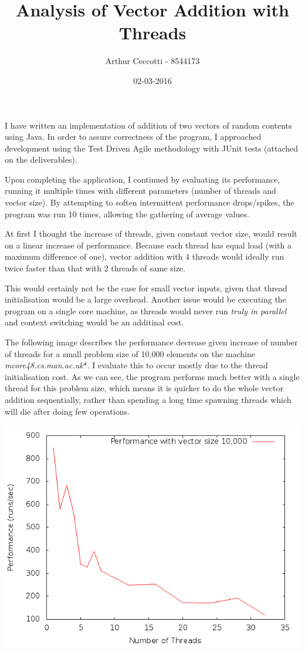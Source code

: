 \documentclass{article}
\title{Analysis of Vector Addition with Threads}
\date{02-03-2016}
\author{Arthur Ceccotti - 8544173}
\begin{document}
  \maketitle

  I have written an implementation of addition of two vectors of random contents using Java.
  In order to assure correctness of the program, I approached development using the Test Driven Agile methodology with JUnit tests (attached on the deliverables).

  Upon completing the application, I continued by evaluating its performance, running it multiple times with different parameters (number of threads and vector size).
  By attempting to soften intermittent performance drops/spikes, the program was run 10 times, allowing the gathering of average values.

  At first I thought the increase of threads, given constant vector size, would result on a linear increase of performance. Because each thread has equal load (with a maximum difference of one), vector addition with 4 threads would ideally run twice faster than that with 2 threads of same size.

  This would certainly not be the case for small vector inputs, given that thread initialisation would be a large overhead.
  Another issue would be executing the program on a single core machine, as threads would never run \textit{truly in parallel} and context switching would be an additinal cost.
  
  The following image describes the performance decrease given increase of number of threads for a small problem size of 10,000 elements on the machine \textit{mcore48.cs.man.ac.uk}*. I evaluate this to occur mostly due to the thread initialisation cost. As we can see, the program performs much better with a single thread for this problem size, which means it is quicker to do the whole vector addition sequentially, rather than spending a long time spawning threads which will die after doing few operations.

  \centerline{\includegraphics[width=\textwidth]{10000}}
  
\end{document}
